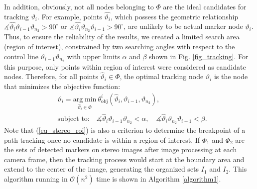 \documentclass[10pt,letterpaper,journal,final,twoside,twocolumn,nofonttune]{IEEEtran}
\begin{document}
In addition, obviously, not all nodes belonging to $\Phi$ are the ideal candidates for tracking $\vartheta_{i}$. For example, points $\hat{\vartheta_{i}}$, which possess the geometric relationship $\measuredangle \hat{\vartheta_{i}}\vartheta_{i-1} \vartheta_{n_2} >90^\circ$ or $\measuredangle \hat{\vartheta_{i}} \vartheta_{n_2} \vartheta_{i-1}> 90^\circ$, are unlikely to be actual marker node $\vartheta_{i}$. Thus, to ensure the reliability of the results, we created a limited search area (region of interest), constrained by two searching angles with respect to the control line $\vartheta_{i-1} \vartheta_{n_2}$ with upper limits $\alpha$ and $\beta$ shown in Fig. \ref{fig_tracking}. For this purpose, only points within region of interest were considered as candidate nodes. Therefore, for all points $\hat{\vartheta}_{i} \in \Phi$, the optimal tracking node $\vartheta_{i}$ is the node that minimizes the objective function:
\begin{align}
\label{eq_stereo_track}
&\vartheta_{i} = \underset{\hat{\vartheta}_{i} \in \Phi} {\mathrm{arg}\; \mathrm{min}} ~\theta^i_{\text{obj}}(\hat{\vartheta}_{i},\vartheta_{i-1},\vartheta_{n_2}),\\
\label{eq_stereo_roi}
&\text{subject to:} \quad \measuredangle \hat{\vartheta}_i\vartheta_{i-1}\vartheta_{n_2} <\alpha,\quad \measuredangle \hat{\vartheta}_i\vartheta_{n_2}\vartheta_{i-1} < \beta.
\end{align}
Note that (\ref{eq_stereo_roi}) is also a criterion to determine the breakpoint of a path tracking once no candidate is within a region of interest. If $\Phi_1$ and $\Phi_2$ are the sets of detected markers on stereo images after image processing at each camera frame, then the tracking process would start at the boundary area and extend to the center of the image, generating the organized sets $I_1 $ and $I_2$. This algorithm running in $\mathcal{O}(n^2)$ time is shown in Algorithm \ref{algorithm1}. 
\end{document}
